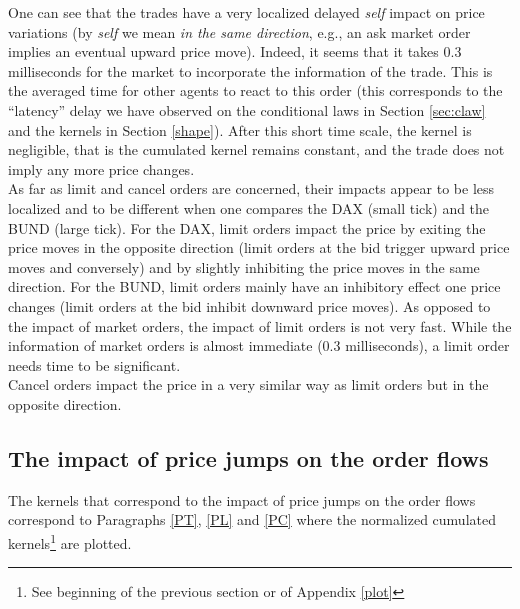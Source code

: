 \documentclass[a4paper,11pt]{article}
\begin{document}
\noindent One can see that the trades have a very localized delayed {\em self} impact on price variations (by {\em self} we mean {\em in the same direction}, e.g., an ask market order
implies an eventual upward price move). Indeed, it seems that it takes 0.3 milliseconds for the market to incorporate the information of the trade. This is the averaged time for other agents to react to this order (this corresponds to the ``latency'' delay we have observed on the conditional laws in Section \ref{sec:claw} and the kernels in Section \ref{shape}).
After this short time scale, the kernel is negligible, that is the cumulated kernel remains constant, and the trade does not imply any more price changes.\\


\noindent As far as limit and cancel orders are concerned, their impacts appear to be less localized and to be different when one compares the DAX (small tick)
and the BUND (large tick). For the DAX, limit orders impact the price by exiting the price moves in the opposite direction (limit orders at the bid trigger upward price moves and conversely) and by slightly inhibiting
the price moves in the same direction. For the BUND, limit orders mainly have an inhibitory effect one price changes (limit orders at the bid inhibit downward price moves). As opposed to the impact of market orders, the impact of limit orders is not very fast. While the information of market orders is almost immediate (0.3 milliseconds), a limit order needs time to be significant. \\


\noindent Cancel orders impact the price in a very similar way as limit orders but in the opposite direction.


\subsection{The impact of price jumps on the order flows}
The kernels that correspond to the impact of price jumps on the order flows correspond to Paragraphs \ref{PT}, \ref{PL} and \ref{PC} where the normalized cumulated kernels\footnote{See beginning of the previous section or of Appendix \ref{plot}} are plotted.\\
\end{document}
